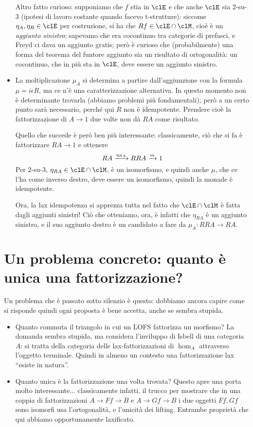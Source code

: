 \documentclass{amsart}
\begin{document}
\begin{itemize}
  Altro fatto curioso: supponiamo che $f$ stia in $\clE$ e che anche $\clE$ sia 2-su-3 (ipotesi di lavoro costante quando facevo t-strutture): siccome $\eta_A, \eta_B \in\clE$ per costruzione, si ha che $Rf \in\clE\cap\clM$, cioè è un \emph{aggiunto sinistro}; sapevamo che era cocontinuo tra categorie di prefasci, e Freyd ci dava un aggiunto gratis; però è curioso che (probabilmente) una forma del teorema del funtore aggiunto sia un risultato di ortogonalità: un cocontinuo, che in più sta in $\clE$, deve essere un aggiunto sinistro.
  \item La moltiplicazione $\mu_A$ si determina a partire dall'aggiunzione con la formula $\mu = i\epsilon R$, ma ce n'è una caratterizzazione alternativa. In questo momento non è determinante trovarla (abbiamo problemi più fondamentali); però a un certo punto sarà necessario, perché qui $R$ non è idempotente. Prendere cioè la fattorizzazione di $A\to 1$ due volte non dà $RA$ come risultato.

  Quello che succede è però ben più interessante: classicamente, ciò che si fa è fattorizzare $RA\to 1$ e ottenere
  \[RA \xrightarrow{\eta_{RA}} RRA \xrightarrow{m} 1 \]
  Per 2-su-3, $\eta_{RA}\in\clE\cap\clM$, è un isomorfismo, e quindi anche $\mu$, che ce l'ha come inverso destro, deve essere un isomorfismo, quindi la monade è idempotente.

  Ora, la lax idempotenza si apprezza tutta nel fatto che $\clE\cap \clM$ è fatta dagli aggiunti sinistri! Ciò che otteniamo, ora, è infatti che $\eta_{RA}$ è un aggiunto sinistro, e il suo aggiunto destro è un candidato a fare da $\mu_A : RRA \to RA$.
\end{itemize}
\section{Un problema concreto: quanto è unica una fattorizzazione?}
Un problema che è passato sotto silenzio è questo: dobbiamo ancora capire come si risponde quindi ogni proposta è bene accetta, anche se sembra stupida.
\begin{itemize}
  \item Quanto commuta il triangolo in cui un LOFS fattorizza un morfismo? La domanda sembra stupida, ma considera l'inviluppo di Isbell di una categoria $A$: si tratta della categoria delle lax-fattorizzazioni di $\hom_A$ attraverso l'oggetto terminale. Quindi in almeno un contesto una fattorizzazione lax ``esiste in natura''.
  \item Quanto unica è la fattorizzazione una volta trovata? Questo apre una porta molto interessante... classicamente infatti, il trucco per mostrare che in una coppia di fattorizzazioni $A \to Ff \to B$ e $A \to Gf\to B$ i due oggetti $Ff,Gf$ sono isomorfi usa l'ortogonalità, e l'unicità dei lifting. Entrambe proprietà che qui abbiamo opportunamente laxificato.
\end{itemize}
\end{document}
